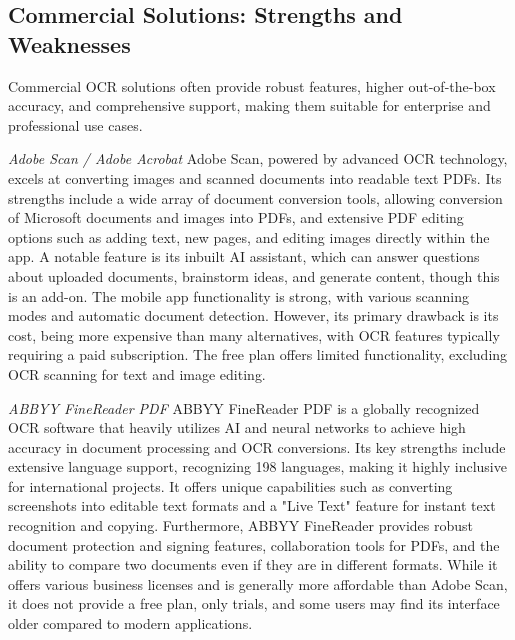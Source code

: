 \subsection{Commercial Solutions: Strengths and Weaknesses}

Commercial OCR solutions often provide robust features, higher out-of-the-box accuracy, and comprehensive support, making them suitable for enterprise and professional use cases.

\emph{Adobe Scan / Adobe Acrobat}
Adobe Scan, powered by advanced OCR technology, excels at converting images and scanned documents into readable text PDFs. \cite{TechRadarOCR} Its strengths include a wide array of document conversion tools, allowing conversion of Microsoft documents and images into PDFs, and extensive PDF editing options such as adding text, new pages, and editing images directly within the app. \cite{TechRadarOCR} A notable feature is its inbuilt AI assistant, which can answer questions about uploaded documents, brainstorm ideas, and generate content, though this is an add-on. \cite{TechRadarOCR} The mobile app functionality is strong, with various scanning modes and automatic document detection. \cite{TechRadarOCR} However, its primary drawback is its cost, being more expensive than many alternatives, with OCR features typically requiring a paid subscription. \cite{TechRadarOCR} The free plan offers limited functionality, excluding OCR scanning for text and image editing. \cite{TechRadarOCR}

\emph{ABBYY FineReader PDF}
ABBYY FineReader PDF is a globally recognized OCR software that heavily utilizes AI and neural networks to achieve high accuracy in document processing and OCR conversions. \cite{TechRadarOCR} Its key strengths include extensive language support, recognizing 198 languages, making it highly inclusive for international projects. \cite{TechRadarOCR} It offers unique capabilities such as converting screenshots into editable text formats and a "Live Text" feature for instant text recognition and copying. \cite{TechRadarOCR} Furthermore, ABBYY FineReader provides robust document protection and signing features, collaboration tools for PDFs, and the ability to compare two documents even if they are in different formats. \cite{TechRadarOCR} While it offers various business licenses and is generally more affordable than Adobe Scan, it does not provide a free plan, only trials, and some users may find its interface older compared to modern applications. \cite{TechRadarOCR}

